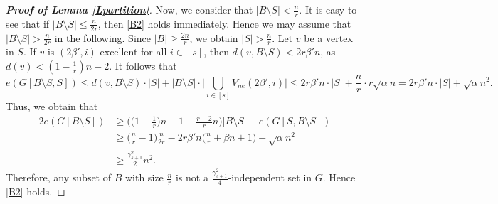 \documentclass[11pt, a4paper]{article}
\theoremstyle{definition}
\newcommand{\<}{\subseteq}
\begin{document}
\begin{proof}[\bf Proof of Lemma \ref{Lpartition}]
Now, we consider that $|B\setminus S|<\frac{n}{r}$. It is easy to see that if $|B\setminus S|\leq \frac{n}{2r}$, then \ref{B2} holds immediately. Hence we may assume that $|B\setminus S|> \frac{n}{2r}$ in the following. Since $|B|\ge \frac{2n}{r}$, we obtain $|S|> \frac{n}{r}$. Let $v$ be a vertex in $S$. If  $v$ is $(2\beta',i)$-excellent for all $i\in [s]$, then $d(v,B\setminus S)<2r \beta' n$, as $d(v)< (1-\frac{1}{r})n -2$. It follows that %
$$e(G[B\setminus S,S])\le d(v,B\setminus S)\cdot |S|+|B\setminus S|\cdot \Big|\bigcup_{i\in [s]}V_{ne}(2\beta',i)\Big|\leq 2r\beta' n\cdot |S|+\frac{n}{r}\cdot r  \sqrt{{\alpha}}n=2r\beta' n\cdot |S|+\sqrt{{\alpha}}n^2.$$
Thus, we obtain that
\begin{align*}
    2e(G[B\setminus S])&\geq \Big(\big(1-\frac{1}{r}\big)n-1-\frac{r-2}{r}n\Big)|B\setminus S|-e(G[S,B\setminus S])\\
    &\geq \Big(\frac{n}{r}-1\Big)\frac{n}{2r}-2r\beta'n \Big(\frac{n}{r}+\beta n+1\Big)-\sqrt{\alpha}n^2\\
    &\geq \frac{\gamma_{s+1}^2}{2}n^2.
\end{align*}
Therefore, any subset of $B$ with size $\frac{n}{r}$ is not a $\frac{\gamma_{s+1}^2}{4}$-independent set in $G$. Hence \ref{B2} holds. 
\end{proof}


\end{document}
